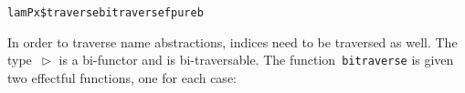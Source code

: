 \documentclass[9pt,authoryear]{sigplanconf}
\begin{document}
{{}\vphantom{$\{$}}\texttt{\mbox{\hspace{0.50em}}}\texttt{\mbox{\hspace{0.50em}}}\texttt{\mbox{\hspace{0.50em}}}\texttt{\mbox{\hspace{0.50em}}}\texttt{\mbox{\hspace{0.50em}}}\texttt{\mbox{\hspace{0.50em}}}\texttt{lamP}\texttt{\mbox{\hspace{0.50em}}}\texttt{x}\texttt{\mbox{\hspace{0.50em}}}\texttt{\makebox[1.22ex][c]{\textless{}}\${}\makebox[1.22ex][c]{\textgreater{}}}\texttt{\mbox{\hspace{0.50em}}}\texttt{traverse}\texttt{\mbox{\hspace{0.50em}}}\texttt{\makebox[1.22ex][l]{$ {(} $}}\texttt{bitraverse}\texttt{\mbox{\hspace{0.50em}}}\texttt{f}\texttt{\mbox{\hspace{0.50em}}}\texttt{pure}\texttt{\makebox[1.22ex][r]{$ {)} $}}\texttt{\mbox{\hspace{0.50em}}}\texttt{b}\texttt{{\nopagebreak \newline%
}\vphantom{$\{$}}%


%
In order to traverse name abstractions, indices need to be traversed
    as well. The type{~}\texttt{\makebox[1.22ex][l]{$ {(} $}}\texttt{$ \vartriangleright $}\texttt{\makebox[1.22ex][r]{$ {)} $}} is a bi-functor and is bi-traversable.
    The function{~}\texttt{bitraverse} is given two effectful functions, one for
    each case{:}%


{\nopagebreak }
\end{document}
